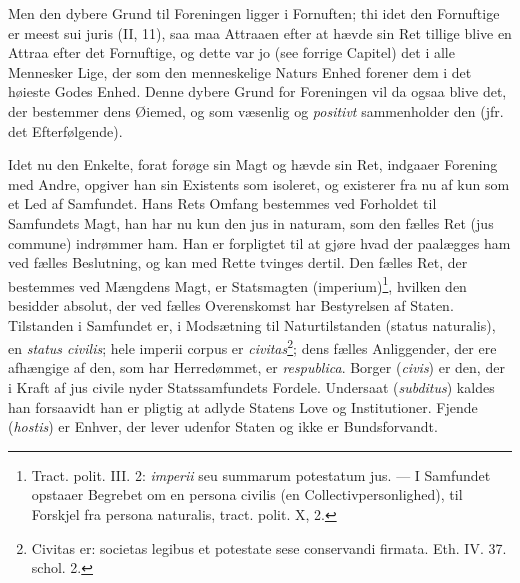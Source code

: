 \documentclass[12pt,a4paper]{book}
\newcommand{\opage}[1]{\marginnote{\footnotesize\textit{[#1]}}}
\begin{document}
\opage{137} \setcounter{footnote}{0}%
Men den dybere Grund til Foreningen ligger i Fornuften; thi idet den Fornuftige er meest sui juris (II, 11), saa maa Attraaen efter at hævde sin Ret tillige blive en Attraa efter det Fornuftige, og dette var jo (see forrige Capitel) det i alle Mennesker Lige, der som den menneskelige Naturs Enhed forener dem i det høieste Godes Enhed. Denne dybere Grund for Foreningen vil da ogsaa blive det, der bestemmer dens Øiemed, og som væsenlig og \emph{positivt} sammenholder den (jfr. det Efterfølgende).

Idet nu den Enkelte, forat forøge sin Magt og hævde sin Ret, indgaaer Forening med Andre, opgiver han sin Existents som isoleret, og existerer fra nu af kun som et Led af Samfundet. Hans Rets Omfang bestemmes ved Forholdet til Samfundets Magt, han har nu kun den jus in naturam, som den fælles Ret (jus commune) indrømmer ham. Han er forpligtet til at gjøre hvad der paalægges ham ved fælles Beslutning, og kan med Rette tvinges dertil. Den fælles Ret, der bestemmes ved Mængdens Magt, er Statsmagten (imperium)\footnote{Tract. polit. III. 2: \emph{imperii} seu summarum potestatum jus. --- I Samfundet opstaaer Begrebet om en persona civilis (en Collectivpersonlighed), til Forskjel fra persona naturalis, tract. polit. X, 2.}, hvilken den besidder absolut, der ved fælles Overenskomst har Bestyrelsen af Staten. Tilstanden i Samfundet er, i Modsætning til Naturtilstanden (status naturalis), en \emph{status civilis}; hele imperii corpus er \emph{civitas}\footnote{Civitas er: societas legibus et potestate sese conservandi firmata. Eth. IV. 37. schol. 2.}; dens fælles Anliggender, der ere afhængige af den, som har Herredømmet, er \emph{respublica}. Borger (\emph{civis}) er den, der i Kraft af jus civile nyder Statssamfundets Fordele. Undersaat (\emph{subditus}) kaldes han forsaavidt han er pligtig at adlyde Statens Love og Institutioner. Fjende (\emph{hostis}) er Enhver, der lever udenfor Staten og ikke er Bundsforvandt.
\end{document}
